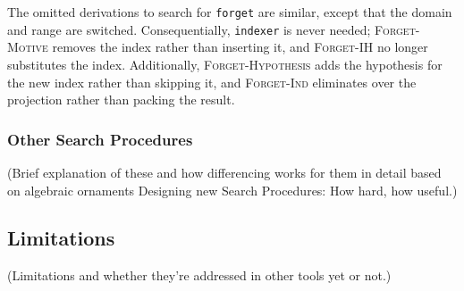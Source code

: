 The omitted derivations to search for \lstinline{forget} are similar,
except that the domain and range are switched. Consequentially, \lstinline{indexer} is never needed;
\textsc{Forget-Motive} removes the index rather than inserting it, and \textsc{Forget-IH} no longer substitutes the index.
Additionally, \textsc{Forget-Hypothesis} adds the hypothesis for the new index
rather than skipping it, and \textsc{Forget-Ind} eliminates over the projection rather than packing the result. %
\fi

\subsubsection{Other Search Procedures}
\label{sec:other}

(Brief explanation of these and how differencing works for them in detail based on algebraic ornaments
Designing new Search Procedures:
How hard, how useful.)

\subsection{Limitations}
\label{sec:pi-diff-limits}

(Limitations and whether they're addressed in other tools yet or not.)

\iffalse
\paragraph{Syntactic Restrictions} Basically syntactic restrictions on inputs for automatic differencing, documented in \toolnamec.

\begin{itemize}
\item \textbf{Inputs}: Inductive types \Aa\ and \B, assuming:
\begin{itemize}
\item \B\ is an algebraic ornament of \Aa,
\item \B\ has the same number of constructors in the same order as \Aa,
\item \Aa\ and \B\ do not contain recursive references to themselves under products, and
\item for every recursive reference to \Aa\ in \Aa, there is exactly one new hypothesis in \B, which is exactly the new index of the corresponding recursive reference in \B.
\end{itemize}
\item \textbf{Outputs}: Functions \lstinline{promote}, \lstinline{forget}, and \lstinline{indexer}, guaranteeing:
\begin{itemize}
\item the outputs form the ornamental promotion isomorphism between the inputs.
\end{itemize}
\end{itemize}
\fi

